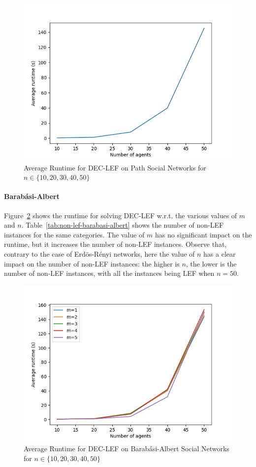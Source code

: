 \documentclass{article}
\begin{document}
\begin{figure}[htb]
\centering
\includegraphics[width=0.45\linewidth]{results-runtime-path.png}
\caption{Average Runtime for DEC-LEF on Path Social Networks for $n \in \{10,20,30,40,50\}$\label{fig:runtime-path}}
\end{figure}

\paragraph{Barab\'asi-Albert} Figure~\ref{fig:runtime-barabasi-albert} shows the runtime for solving DEC-LEF w.r.t. the various values of  $m$ and $n$. Table~\ref{tab:non-lef-barabasi-albert} shows the number of non-LEF instances for the same categories. The value of $m$ has no significant impact on the runtime, but it increases the number of non-LEF instances. Observe that, contrary to the case of Erd\"os-R\'enyi networks, here the value of $n$ has a clear impact on the number of non-LEF instances: the higher is $n$, the lower is the number of non-LEF instances, with all the instances being LEF when $n=50$.

\begin{figure}[htb]
\centering
\includegraphics[width=0.45\linewidth]{results-runtime-BA.png}
\caption{Average Runtime for DEC-LEF on Barab\'asi-Albert Social Networks for $n \in \{10,20,30,40,50\}$\label{fig:runtime-barabasi-albert}}
\end{figure}
\end{document}
